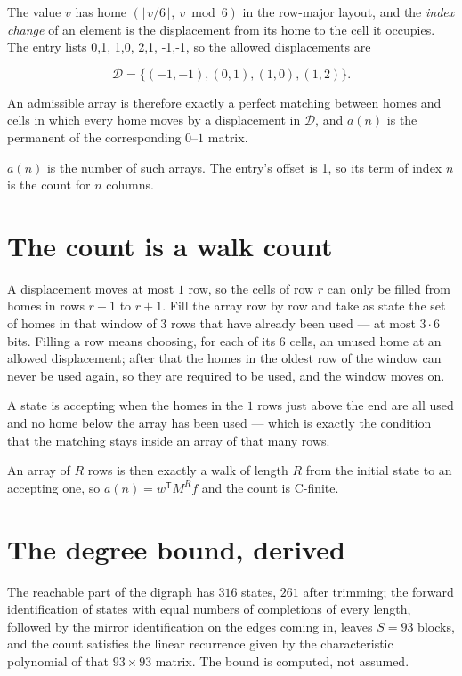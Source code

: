\documentclass[11pt]{article}
\theoremstyle{definition}
\begin{document}
The value $v$ has home $(\lfloor v/6\rfloor,\ v \bmod 6)$ in the row-major layout, and the {\itshape index change} of an element is the displacement from its home to the cell it occupies. The entry lists 0,1, 1,0, 2,1, -1,-1, so the allowed displacements are

\[\mathcal{D} = \{(-1,-1), (0,1), (1,0), (1,2)\}.\]

An admissible array is therefore exactly a perfect matching between homes and cells in which every home moves by a displacement in $\mathcal{D}$, and $a(n)$ is the permanent of the corresponding $0$--$1$ matrix.

$a(n)$ is the number of such arrays. The entry's offset is 1, so its term of index $n$ is the count for $n$ columns.

\section{The count is a walk count}

A displacement moves at most $1$ row, so the cells of row $r$ can only be filled from homes in rows $r-1$ to $r+1$. Fill the array row by row and take as state the set of homes in that window of $3$ rows that have already been used --- at most $3\cdot6$ bits. Filling a row means choosing, for each of its $6$ cells, an unused home at an allowed displacement; after that the homes in the oldest row of the window can never be used again, so they are required to be used, and the window moves on.

A state is accepting when the homes in the $1$ rows just above the end are all used and no home below the array has been used --- which is exactly the condition that the matching stays inside an array of that many rows.

An array of $R$ rows is then exactly a walk of length $R$ from the initial state to an accepting one, so $a(n) = w^{\mathsf T}M^{R}f$ and the count is C-finite.

\section{The degree bound, derived}

The reachable part of the digraph has $316$ states, $261$ after trimming; the forward identification of states with equal numbers of completions of every length, followed by the mirror identification on the edges coming in, leaves $S = 93$ blocks, and the count satisfies the linear recurrence given by the characteristic polynomial of that $93\times93$ matrix. The bound is computed, not assumed.
\end{document}
